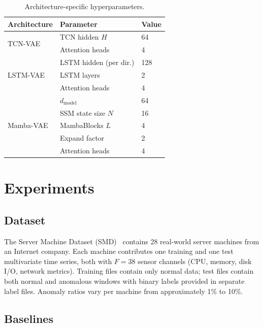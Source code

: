 \documentclass[10pt,twocolumn]{article}
\begin{document}
\begin{table}[h]
\centering
\caption{Architecture-specific hyperparameters.}
\label{tab:arch_hp}
\begin{tabular}{lll}
\toprule
Architecture & Parameter & Value \\
\midrule
\multirow{2}{*}{TCN-VAE}   & TCN hidden $H$ & 64 \\
                            & Attention heads & 4 \\
\midrule
\multirow{3}{*}{LSTM-VAE}  & LSTM hidden (per dir.) & 128 \\
                            & LSTM layers & 2 \\
                            & Attention heads & 4 \\
\midrule
\multirow{5}{*}{Mamba-VAE} & $d_{\text{model}}$ & 64 \\
                            & SSM state size $N$ & 16 \\
                            & MambaBlocks $L$ & 4 \\
                            & Expand factor & 2 \\
                            & Attention heads & 4 \\
\bottomrule
\end{tabular}
\end{table}


\section{Experiments}

\subsection{Dataset}

The Server Machine Dataset (SMD)~\cite{su2019robust} contains 28 real-world
server machines from an Internet company. Each machine contributes one training
and one test multivariate time series, both with $F = 38$ sensor channels
(CPU, memory, disk I/O, network metrics). Training files contain only normal
data; test files contain both normal and anomalous windows with binary labels
provided in separate label files. Anomaly ratios vary per machine from
approximately 1\% to 10\%.

\subsection{Baselines}
\end{document}
